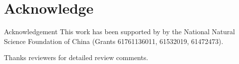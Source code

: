 \vspace{-1.8em}
\section{Acknowledge}
\vspace{-1em}

Acknowledgement
This work has been supported by by the National Natural Science Foundation of
China (Grants 61761136011, 61532019, 61472473).

Thanks reviewers for detailed review comments.